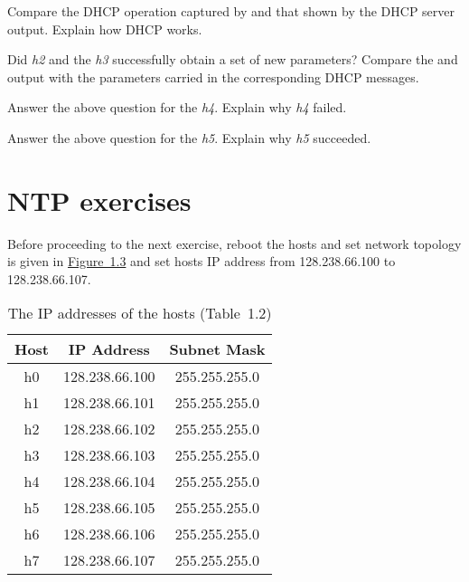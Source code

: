 \documentclass{../UTNetLab}
\begin{document}
\begin{report}
    \item Compare the DHCP operation captured by  and that shown by the DHCP server output.
    Explain how DHCP works.

    \item Did \textit{h2} and the \textit{h3} successfully obtain a set of new parameters?
    Compare the  and  output with the parameters carried in the corresponding DHCP messages.

    \item Answer the above question for the \textit{h4}.
    Explain why \textit{h4} failed.

    \item Answer the above question for the \textit{h5}.
    Explain why \textit{h5} succeeded.
\end{report}

\part{NTP exercises}
Before proceeding to the next exercise, reboot the hosts and set network topology is given in \hyperref[fig:1.3]{Figure~1.3} and set hosts IP address from 128.238.66.100 to 128.238.66.107.
\begin{center}
    \begin{minipage}{0.48\textwidth}
        \begin{flushleft}
            \begin{table}[H]
                \caption{The IP addresses of the hosts (Table~1.2)}
                \centering
                \begin{tabular}{ c c c }
                    \hline \hline
                    Host & IP Address     & Subnet Mask   \\
                    \hline
                    h0   & 128.238.66.100 & 255.255.255.0 \\
                    h1   & 128.238.66.101 & 255.255.255.0 \\
                    h2   & 128.238.66.102 & 255.255.255.0 \\
                    h3   & 128.238.66.103 & 255.255.255.0 \\
                    h4   & 128.238.66.104 & 255.255.255.0 \\
                    h5   & 128.238.66.105 & 255.255.255.0 \\
                    h6   & 128.238.66.106 & 255.255.255.0 \\
                    h7   & 128.238.66.107 & 255.255.255.0 \\
                    \hline \hline
                \end{tabular}
            \end{table}
        \end{flushleft}
    \end{minipage}
\end{center}
\end{document}
